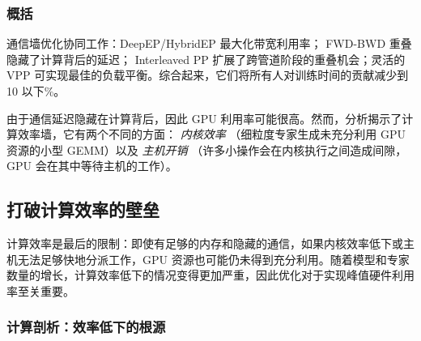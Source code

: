 \documentclass[10pt,logo,copyright]{nvidiatechreport_zh}
\begin{document}


\subsubsection{概括}
通信墙优化协同工作：DeepEP/HybridEP 最大化带宽利用率； FWD-BWD 重叠隐藏了计算背后的延迟； Interleaved PP 扩展了跨管道阶段的重叠机会；灵活的 VPP 可实现最佳的负载平衡。综合起来，它们将所有人对训练时间的贡献减少到 10 以下\%。

由于通信延迟隐藏在计算背后，因此 GPU 利用率可能很高。然而，分析揭示了计算效率墙，它有两个不同的方面： \textit{内核效率} （细粒度专家生成未充分利用 GPU 资源的小型 GEMM）以及 \textit{主机开销} （许多小操作会在内核执行之间造成间隙，GPU 会在其中等待主机的工作）。

\subsection{打破计算效率的壁垒}\label{sec:compute-wall}

计算效率是最后的限制：即使有足够的内存和隐藏的通信，如果内核效率低下或主机无法足够快地分派工作，GPU 资源也可能仍未得到充分利用。随着模型和专家数量的增长，计算效率低下的情况变得更加严重，因此优化对于实现峰值硬件利用率至关重要。

\subsubsection{计算剖析：效率低下的根源}
\end{document}
